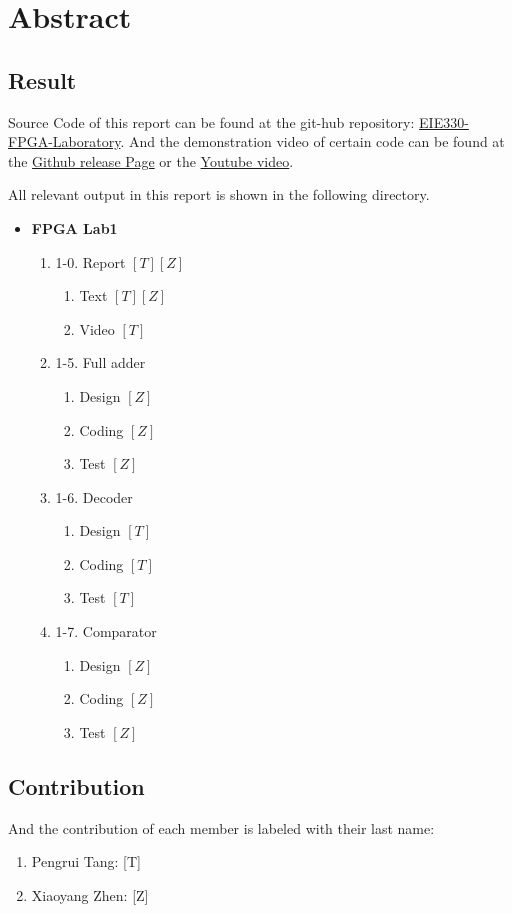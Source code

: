 \section{Abstract}
\subsection{Result}
    Source Code of this report can be found at the git-hub repository: 
    \href{https://github.com/ZeppelinSCB/EIE330-FPGA-LAB-Report}
        {EIE330-FPGA-Laboratory}.
    And the demonstration video of certain code can be found at the 
    \href{https://github.com/ZeppelinSCB/EIE330-FPGA-LAB-Report/releases/tag/Lab1}
        {Github release Page} or the 
    \href{https://youtu.be/Y6uJHuLJlvs?si=V1s7UhBXShNtMzgG}
        {Youtube video}.\par
    All relevant output in this report is shown in the following directory.
    \begin{itemize}
    \item \textbf{FPGA Lab1}
        \begin{enumerate}
        \item 1-0. Report $[T][Z]$
            \begin{enumerate}
            \item Text $[T][Z]$
            \item Video $[T]$
            \end{enumerate}
        \item 1-5. Full adder
            \begin{enumerate}
            \item Design $[Z]$
            \item Coding $[Z]$
            \item Test $[Z]$
            \end{enumerate}
        \item 1-6. Decoder
            \begin{enumerate}
            \item Design $[T]$
            \item Coding $[T]$
            \item Test $[T]$
            \end{enumerate}
        \item 1-7. Comparator
            \begin{enumerate}
            \item Design $[Z]$
            \item Coding $[Z]$
            \item Test $[Z]$
            \end{enumerate}
        \end{enumerate}
    \end{itemize}
\subsection{Contribution}
    And the contribution of each member is labeled with their last name:
    \begin{enumerate}[]
        \item Pengrui Tang: [T]
        \item Xiaoyang Zhen: [Z]
    \end{enumerate}